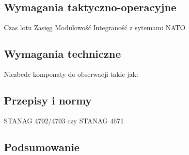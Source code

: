 \subsection{Wymagania taktyczno-operacyjne}
Czas lotu
Zasięg
Modulowość
Integraność z sytemami NATO
\subsection{Wymagania techniczne}
Niezbede komponaty do obserwacji takie jak:

\subsection{Przepisy i normy}
STANAG 4702/4703 czy STANAG 4671
\subsection{Podsumowanie}

